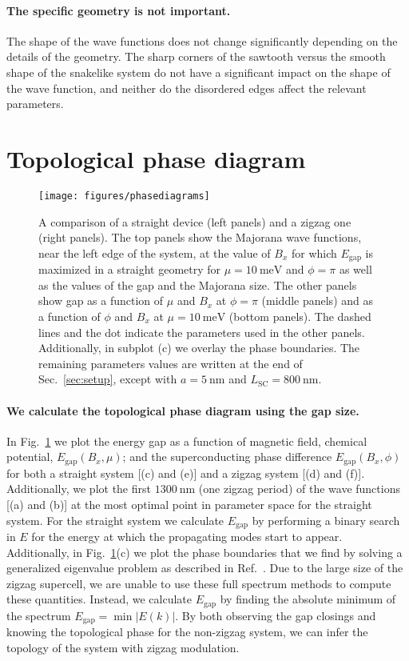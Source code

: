 \documentclass[english, twocolumn, 10pt, aps, superscriptaddress, floatfix, prb, citeautoscript]{revtex4-1}
\renewcommand{\comment}[2]{#2}
\renewcommand{\comment}{\paragraph}
\begin{document}
\comment{The specific geometry is not important.}
The shape of the wave functions does not change significantly depending on the details of the geometry.
The sharp corners of the sawtooth versus the smooth shape of the snakelike system do not have a significant impact on the shape of the wave function, and neither do the disordered edges affect the relevant parameters.

\section{Topological phase diagram}

\begin{figure}[!htb]
\texttt{[image: figures/phasediagrams]}
\caption{A comparison of a straight device (left panels) and a zigzag one (right panels).
The top panels show the Majorana wave functions, near the left edge of the system, at the value of $B_x$ for which $E_\textrm{gap}$ is maximized in a straight geometry for $\mu=\SI{10}{\meV}$ and $\phi=\pi$ as well as the values of the gap and the Majorana size.
The other panels show gap as a function of $\mu$ and $B_x$ at $\phi=\pi$ (middle panels) and as a function of $\phi$ and $B_x$ at $\mu=\SI{10}{\meV}$ (bottom panels).
The dashed lines and the dot indicate the parameters used in the other panels.
Additionally, in subplot (c) we overlay the phase boundaries.
The remaining parameters values are written at the end of Sec.~\ref{sec:setup}, except with $a=\SI{5}{\nm}$ and $L_\textrm{SC}=\SI{800}{\nm}$.
\label{fig:phasediagrams}}
\end{figure}

\comment{We calculate the topological phase diagram using the gap size.}
In Fig.~\ref{fig:phasediagrams} we plot the energy gap as a function of magnetic field, chemical potential, $E_\textrm{gap}(B_x, \mu)$; and the superconducting phase difference $E_\textrm{gap}(B_x, \phi)$ for both a straight system [(c) and (e)] and a zigzag system [(d) and (f)].
Additionally, we plot the first $\SI{1300}{\nm}$ (one zigzag period) of the wave functions [(a) and (b)] at the most optimal point in parameter space for the straight system.
For the straight system we calculate $E_\textrm{gap}$ by performing a binary search in $E$ for the energy at which the propagating modes start to appear.~\cite{nijholt2015orbital}
Additionally, in Fig.~\ref{fig:phasediagrams}(c) we plot the phase boundaries that we find by solving a generalized eigenvalue problem as described in Ref.~.
Due to the large size of the zigzag supercell, we are unable to use these full spectrum methods to compute these quantities.
Instead, we calculate $E_\textrm{gap}$ by finding the absolute minimum of the spectrum $E_\textrm{gap}=\min{|E(k)|}$.
By both observing the gap closings and knowing the topological phase for the non-zigzag system, we can infer the topology of the system with zigzag modulation.
\end{document}

